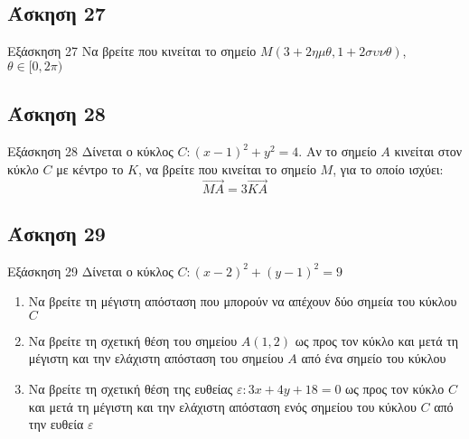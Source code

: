 \documentclass[greek]{beamer}
\begin{document}
\subsection{Άσκηση 27}
\begin{frame}[label=Άσκηση27,t]{Εξάσκηση 27}
  Να βρείτε που κινείται το σημείο $Μ(3+2ημθ,1+2συνθ)$, $θ\in [0,2π)$

\end{frame}

\subsection{Άσκηση 28}
\begin{frame}[label=Άσκηση28,t]{Εξάσκηση 28}
  Δίνεται ο κύκλος $C:(x-1)^2+y^2=4$. Αν το σημείο $Α$ κινείται στον κύκλο $C$ με κέντρο το $Κ$, να βρείτε που κινείται το σημείο $Μ$, για το οποίο ισχύει:
  $$\overrightarrow{ΜΑ}=3\overrightarrow{ΚΑ}$$

\end{frame}

\subsection{Άσκηση 29}
\begin{frame}[label=Άσκηση29,t]{Εξάσκηση 29}
  Δίνεται ο κύκλος $C:(x-2)^2+(y-1)^2=9$
  \begin{enumerate}
    \item<1-> Να βρείτε τη μέγιστη απόσταση που μπορούν να απέχουν δύο σημεία του κύκλου $C$
    \item<2-> Να βρείτε τη σχετική θέση του σημείου $Α(1,2)$ ως προς τον κύκλο και μετά τη μέγιστη και την ελάχιστη απόσταση του σημείου $Α$ από ένα σημείο του κύκλου
    \item<3-> Να βρείτε τη σχετική θέση της ευθείας $ε:3x+4y+18=0$ ως προς τον κύκλο $C$ και μετά τη μέγιστη και την ελάχιστη απόσταση ενός σημείου του κύκλου $C$ από την ευθεία $ε$
  \end{enumerate}

\end{frame}
\end{document}

